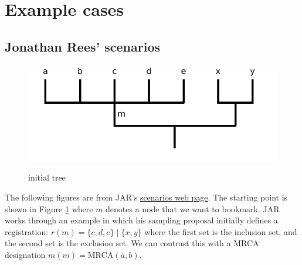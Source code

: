 \documentclass[11pt]{article}
\newcommand{\registration}[3]{{\ensuremath{r(#1)=\{#2\}\mid\{#3\}}}\xspace}
\newcommand{\mrcaDesig}[3]{{\ensuremath{m(#1)=\mbox{MRCA}(#2, #3)}}\xspace}
\begin{document}
\section{Example cases}
\subsection{Jonathan Rees' scenarios}
\begin{figure}[h!]
   \centering \includegraphics[scale=.5]{images/jar-example.pdf}\\
   \caption{initial tree}\label{jarInitialTree}
\end{figure}
The following figures are from JAR's \href{https://rawgit.com/OpenTreeOfLife/reference-taxonomy/registry/registry/doc/scenarios.html}{scenarios web page}.
The starting point is shown in Figure \ref{jarInitialTree} where
$m$ denotes a node that we want to bookmark.
JAR works through an example in which his sampling proposal
  initially defines a registration: \registration{m}{c,d,e}{x,y} where the
  first set is the inclusion set, and the second set is the exclusion set.
We can contrast this with a MRCA designation \mrcaDesig{m}{a}{b}.
\end{document}
